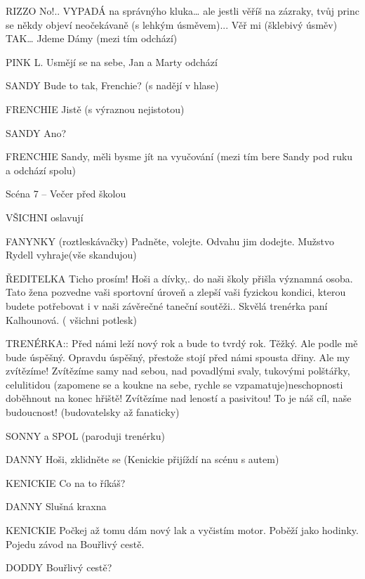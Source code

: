 RIZZO        No!.. VYPADÁ na správnýho kluka… ale jestli věříš na zázraky, tvůj princ         se někdy objeví neočekávaně (s lehkým úsměvem)... Věř mi (šklebivý         úsměv) TAK… Jdeme Dámy (mezi tím odchází)

PINK L.         Usmějí se na sebe, Jan a Marty odchází

SANDY        Bude to tak, Frenchie? (s nadějí v hlase)

FRENCHIE        Jistě (s výraznou nejistotou)

SANDY        Ano? 

FRENCHIE        Sandy, měli bysme jít na vyučování (mezi tím bere Sandy pod ruku a         odchází spolu)





Scéna 7 – Večer před školou

VŠICHNI                         oslavují 

      FANYNKY (roztleskávačky) Padněte, volejte. Odvahu jim dodejte. Mužstvo Rydell                                vyhraje(vše skandujou)

ŘEDITELKA         Ticho prosím! Hoši a dívky,. do naši školy přišla významná osoba.                  Tato žena pozvedne vaši sportovní úroveň a zlepší vaši fyzickou kondici,         kterou budete potřebovat i v naši závěrečné taneční soutěži.. Skvělá         trenérka paní Kalhounová. ( všichni potlesk)

TRENÉRKA::         Před námi leží nový rok a bude to tvrdý rok. Těžký. Ale podle mě bude         úspěšný. Opravdu úspěšný, přestože stojí před námi spousta dřiny.  Ale         my zvítězíme! Zvítězíme samy nad sebou, nad povadlými svaly,                 tukovými polštářky, celulitidou (zapomene se a koukne na sebe, rychle         se vzpamatuje)neschopnosti doběhnout na konec hřiště! Zvítězíme nad         leností a pasivitou!  To je náš cíl, naše budoucnost! (budovatelsky až         fanaticky)    

 SONNY a SPOL  (paroduji trenérku)

 DANNY        Hoši, zklidněte se  (Kenickie přijíždí na scénu s autem)

KENICKIE        Co na to říkáš?

DANNY        Slušná kraxna

KENICKIE        Počkej až tomu dám nový lak a vyčistím motor. Poběží jako hodinky.                     Pojedu závod na Bouřlivý cestě. 

DODDY        Bouřlivý cestě?

